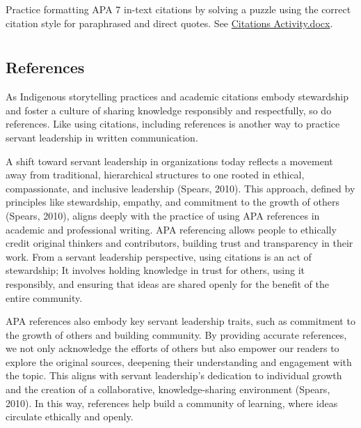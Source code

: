 \documentclass[
  letterpaper,
  DIV=11,
  numbers=noendperiod]{scrreprt}
\begin{document}
Practice formatting APA 7 in-text citations by solving a puzzle using
the correct citation style for paraphrased and direct quotes. See
\href{https://learn.twu.ca/pluginfile.php/1424895/mod_book/chapter/42916/Citations\%20Activity.docx}{Citations
Activity.docx}.


\chapter*{}\label{section-12}

\markboth{}{}

\section*{References}\label{references-6}


As Indigenous storytelling practices and academic citations embody
stewardship and foster a culture of sharing knowledge responsibly and
respectfully, so do references. Like using citations, including
references is another way to practice servant leadership in written
communication.

A shift toward servant leadership in organizations today reflects a
movement away from traditional, hierarchical structures to one rooted in
ethical, compassionate, and inclusive leadership (Spears, 2010). This
approach, defined by principles like stewardship, empathy, and
commitment to the growth of others (Spears, 2010), aligns deeply with
the practice of using APA references in academic and professional
writing. APA referencing allows people to ethically credit original
thinkers and contributors, building trust and transparency in their
work. From a servant leadership perspective, using citations is an act
of stewardship; It involves holding knowledge in trust for others, using
it responsibly, and ensuring that ideas are shared openly for the
benefit of the entire community.

APA references also embody key servant leadership traits, such as
commitment to the growth of others and building community. By providing
accurate references, we not only acknowledge the efforts of others but
also empower our readers to explore the original sources, deepening
their understanding and engagement with the topic. This aligns with
servant leadership's dedication to individual growth and the creation of
a collaborative, knowledge-sharing environment (Spears, 2010). In this
way, references help build a community of learning, where ideas
circulate ethically and openly.
\end{document}
